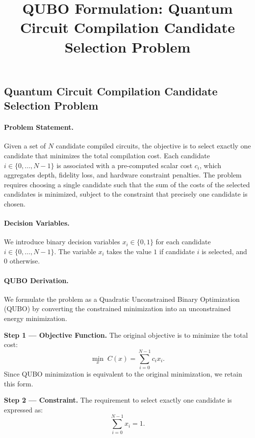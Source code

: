 \documentclass[12pt]{article}
\title{QUBO Formulation: Quantum Circuit Compilation Candidate Selection Problem}
\date{}
\begin{document}
\maketitle

\subsection*{Quantum Circuit Compilation Candidate Selection Problem}

\paragraph{Problem Statement.}
Given a set of $N$ candidate compiled circuits, the objective is to select exactly one candidate that minimizes the total compilation cost. Each candidate $i \in \{0, \dots, N-1\}$ is associated with a pre-computed scalar cost $c_i$, which aggregates depth, fidelity loss, and hardware constraint penalties. The problem requires choosing a single candidate such that the sum of the costs of the selected candidates is minimized, subject to the constraint that precisely one candidate is chosen.

\paragraph{Decision Variables.}
We introduce binary decision variables $x_i \in \{0, 1\}$ for each candidate $i \in \{0, \dots, N-1\}$. The variable $x_i$ takes the value $1$ if candidate $i$ is selected, and $0$ otherwise.

\paragraph{QUBO Derivation.}
We formulate the problem as a Quadratic Unconstrained Binary Optimization (QUBO) by converting the constrained minimization into an unconstrained energy minimization.

\textbf{Step 1 --- Objective Function.}
The original objective is to minimize the total cost:
\begin{equation}
    \min_{x} \; C(x) = \sum_{i=0}^{N-1} c_i x_i.
\end{equation}
Since QUBO minimization is equivalent to the original minimization, we retain this form.

\textbf{Step 2 --- Constraint.}
The requirement to select exactly one candidate is expressed as:
\begin{equation}
    \sum_{i=0}^{N-1} x_i = 1.
\end{equation}
\end{document}
